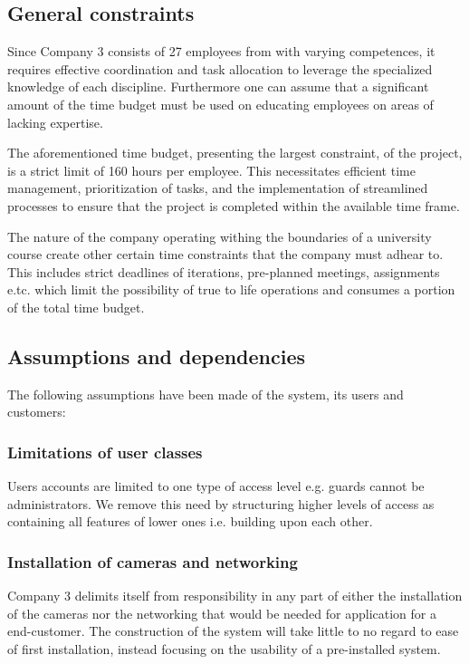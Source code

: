 \documentclass{article}
\begin{document}
\subsection{General constraints}
Since Company 3 consists of 27 employees from with varying competences, it requires effective coordination and task allocation to leverage the specialized knowledge of each discipline. Furthermore one can assume that a significant amount of the time budget must be used on educating employees on areas of lacking expertise. 

The aforementioned time budget, presenting the largest constraint, of the project, is a strict limit of 160 hours per employee. This necessitates efficient time management, prioritization of tasks, and the implementation of streamlined processes to ensure that the project is completed within the available time frame. 

The nature of the company operating withing the boundaries of a university course create other certain time constraints that the company must adhear to. This includes strict deadlines of iterations, pre-planned meetings, assignments e.tc. which limit the possibility of true to life operations and consumes a portion of the total time budget. 

\subsection{Assumptions and dependencies}
The following assumptions have been made of the system, its users and customers:

\subsubsection{Limitations of user classes}
Users accounts are limited to one type of access level e.g. guards cannot be administrators. We remove this need by structuring higher levels of access as containing all features of lower ones i.e. building upon each other. 

\subsubsection{Installation of cameras and networking}
Company 3 delimits itself from responsibility in any part of either the installation of the cameras nor the networking that would be needed for application for a end-customer. The construction of the system will take little to no regard to ease of first installation, instead focusing on the usability of a pre-installed system.
\end{document}
